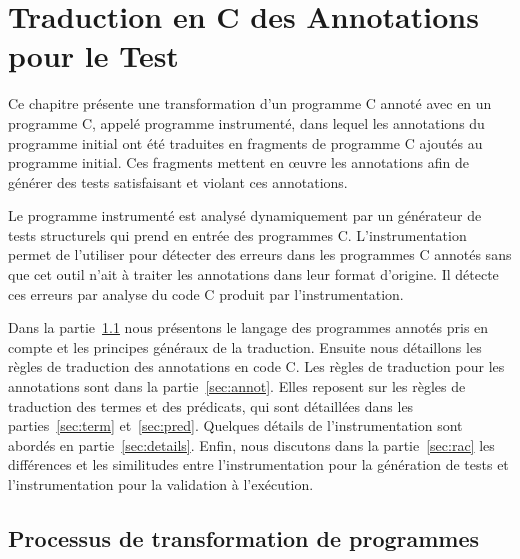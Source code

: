 
\chapter{Traduction en C des Annotations pour le Test}
\label{sec:traduction}

\chapterintro


Ce chapitre présente une transformation d'un programme C annoté avec \eacsl en
un programme C, appelé programme instrumenté, dans lequel les annotations
\eacsl du programme initial ont été traduites en fragments de programme C
ajoutés au programme initial.
Ces fragments mettent en \oe{}uvre les annotations \eacsl afin de générer des
tests satisfaisant et violant ces annotations.

Le programme instrumenté est analysé dynamiquement par un générateur de tests
structurels qui prend en entrée des programmes C.
L'instrumentation permet de l'utiliser pour détecter des erreurs dans les
programmes C annotés sans que cet outil n'ait à traiter les annotations dans
leur format d'origine.
Il détecte ces erreurs par analyse du code C produit par l'instrumentation.

Dans la partie~\ref{sec:process} nous présentons le langage des programmes
annotés pris en compte et les principes généraux de la traduction.
Ensuite nous détaillons les règles de traduction des annotations \eacsl en code
C.
Les règles de traduction pour les annotations sont dans la
partie~\ref{sec:annot}.
Elles reposent sur les règles de traduction des termes et des prédicats, qui
sont détaillées dans les parties~\ref{sec:term} et~\ref{sec:pred}.
Quelques détails de l'instrumentation sont abordés en partie~\ref{sec:details}.
Enfin, nous discutons dans la partie~\ref{sec:rac} les différences et les
similitudes entre l'instrumentation pour la génération de tests et
l'instrumentation pour la validation à l'exécution.


\section{Processus de transformation de programmes}
\label{sec:process}




